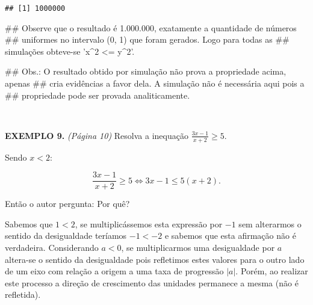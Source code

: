 \documentclass[]{book}
\newenvironment{Shaded}{\begin{snugshade}}{\end{snugshade}}
\newcommand{\NormalTok}[1]{#1}
\begin{document}
\begin{verbatim}
## [1] 1000000
\end{verbatim}

\begin{Shaded}
\begin{Highlighting}[]
\NormalTok{##  Observe que o resultado é 1.000.000, exatamente a quantidade de números}
\NormalTok{## uniformes no intervalo (0, 1) que foram gerados. Logo para todas as}
\NormalTok{## simulações obteve-se 'x^2 <= y^2'.}

\NormalTok{##  Obs.: O resultado obtido por simulação não prova a propriedade acima, apenas}
\NormalTok{## cria evidências a favor dela. A simulação não é necessária aqui pois a}
\NormalTok{## propriedade pode ser provada analiticamente.}
\end{Highlighting}
\end{Shaded}

~

\textbf{EXEMPLO 9.} \emph{(Página 10)} Resolva a inequação
\(\frac{3x-1}{x+2} \geqslant 5\).

Sendo \(x < 2\):

\[\frac{3x-1}{x+2} \geqslant 5 \Leftrightarrow 3x-1 \leqslant 5(x+2).\]

Então o autor pergunta: Por quê?

Sabemos que \(1 < 2\), se multiplicássemos esta expressão por \(-1\) sem
alterarmos o sentido da desigualdade teríamos \(-1 < -2\) e sabemos que
esta afirmação não é verdadeira. Considerando \(a < 0\), se
multiplicarmos uma desigualdade por \(a\) altera-se o sentido da
desigualdade pois refletimos estes valores para o outro lado de um eixo
com relação a origem a uma taxa de progressão \(\left | a \right |\).
Porém, ao realizar este processo a direção de crescimento das unidades
permanece a mesma (não é refletida).

~
\end{document}

